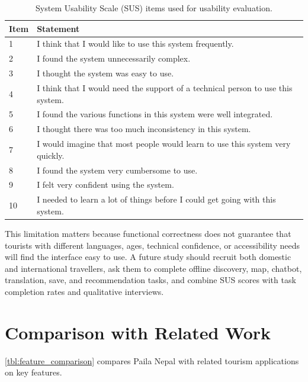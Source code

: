 \documentclass[12pt,a4paper,oneside]{report}
\begin{document}
\begin{table}[h]
\centering
\small
\begin{tabular}{lp{8cm}}
\toprule
\textbf{Item} & \textbf{Statement} \\
\midrule
1 & I think that I would like to use this system frequently. \\
2 & I found the system unnecessarily complex. \\
3 & I thought the system was easy to use. \\
4 & I think that I would need the support of a technical person to use this system. \\
5 & I found the various functions in this system were well integrated. \\
6 & I thought there was too much inconsistency in this system. \\
7 & I would imagine that most people would learn to use this system very quickly. \\
8 & I found the system very cumbersome to use. \\
9 & I felt very confident using the system. \\
10 & I needed to learn a lot of things before I could get going with this system. \\
\bottomrule
\end{tabular}
\caption{System Usability Scale (SUS) items used for usability evaluation.}
\label{tbl:sus_items}
\end{table}

This limitation matters because functional correctness does not guarantee that tourists with different languages, ages, technical confidence, or accessibility needs will find the interface easy to use. A future study should recruit both domestic and international travellers, ask them to complete offline discovery, map, chatbot, translation, save, and recommendation tasks, and combine SUS scores with task completion rates and qualitative interviews.

\section{Comparison with Related Work}
\label{sec:comparison}

\cref{tbl:feature_comparison} compares Paila Nepal with related tourism applications on key features.
\end{document}

